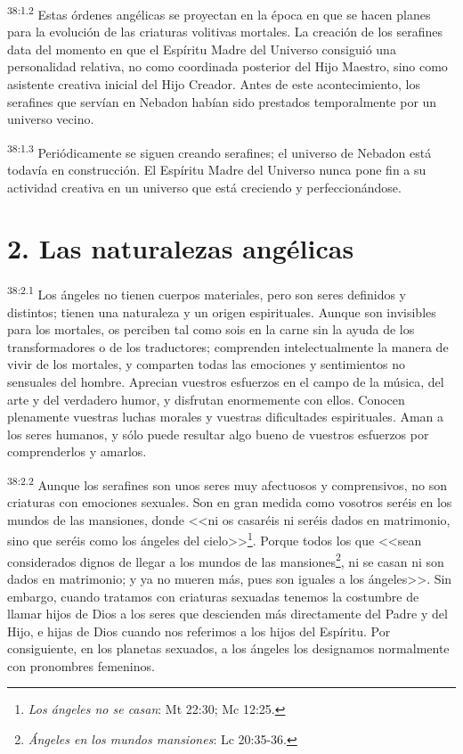 \par
\textsuperscript{38:1.2} Estas órdenes angélicas se proyectan en la época en que se hacen planes para la evolución de las criaturas volitivas mortales. La creación de los serafines data del momento en que el Espíritu Madre del Universo consiguió una personalidad relativa, no como coordinada posterior del Hijo Maestro, sino como asistente creativa inicial del Hijo Creador. Antes de este acontecimiento, los serafines que servían en Nebadon habían sido prestados temporalmente por un universo vecino.

\par
\textsuperscript{38:1.3} Periódicamente se siguen creando serafines; el universo de Nebadon está todavía en construcción. El Espíritu Madre del Universo nunca pone fin a su actividad creativa en un universo que está creciendo y perfeccionándose.

\section*{2. Las naturalezas angélicas}
\par
\textsuperscript{38:2.1} Los ángeles no tienen cuerpos materiales, pero son seres definidos y distintos; tienen una naturaleza y un origen espirituales. Aunque son invisibles para los mortales, os perciben tal como sois en la carne sin la ayuda de los transformadores o de los traductores; comprenden intelectualmente la manera de vivir de los mortales, y comparten todas las emociones y sentimientos no sensuales del hombre. Aprecian vuestros esfuerzos en el campo de la música, del arte y del verdadero humor, y disfrutan enormemente con ellos. Conocen plenamente vuestras luchas morales y vuestras dificultades espirituales. Aman a los seres humanos, y sólo puede resultar algo bueno de vuestros esfuerzos por comprenderlos y amarlos.

\par
\textsuperscript{38:2.2} Aunque los serafines son unos seres muy afectuosos y comprensivos, no son criaturas con emociones sexuales. Son en gran medida como vosotros seréis en los mundos de las mansiones, donde <<ni os casaréis ni seréis dados en matrimonio, sino que seréis como los ángeles del cielo>>\footnote{\textit{Los ángeles no se casan}: Mt 22:30; Mc 12:25.}. Porque todos los que <<sean considerados dignos de llegar a los mundos de las mansiones\footnote{\textit{Ángeles en los mundos mansiones}: Lc 20:35-36.}, ni se casan ni son dados en matrimonio; y ya no mueren más, pues son iguales a los ángeles>>. Sin embargo, cuando tratamos con criaturas sexuadas tenemos la costumbre de llamar hijos de Dios a los seres que descienden más directamente del Padre y del Hijo, e hijas de Dios cuando nos referimos a los hijos del Espíritu. Por consiguiente, en los planetas sexuados, a los ángeles los designamos normalmente con pronombres femeninos.

